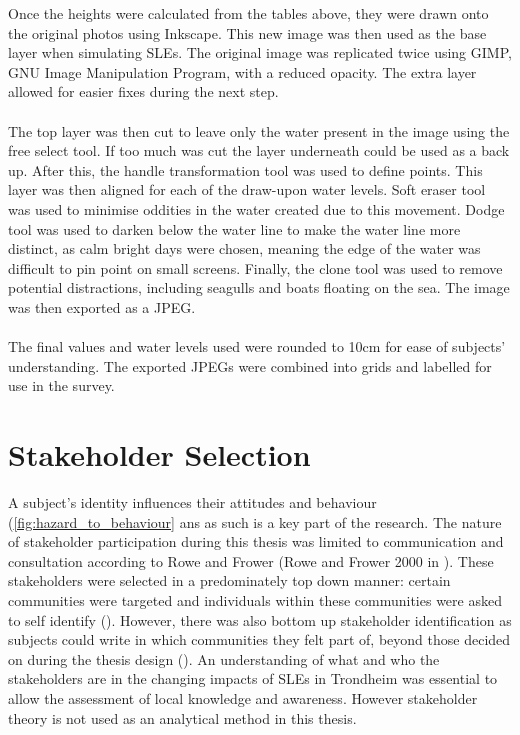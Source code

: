Once the heights were calculated from the tables above, they were drawn onto the original photos using Inkscape. This new image was then used as the base layer when simulating SLEs. The original image was replicated twice using GIMP, GNU Image Manipulation Program, with a reduced opacity. The extra layer allowed for easier fixes during the next step. 
\paragraph{}
The top layer was then cut to leave only the water present in the image using the free select tool. If too much was cut the layer underneath could be used as a back up. After this, the handle transformation tool was used to define points. This layer was then aligned for each of the draw-upon water levels. Soft eraser tool was used to minimise oddities in the water created due to this movement. Dodge tool was used to darken below the water line to make the water line more distinct, as calm bright days were chosen, meaning the edge of the water was difficult to pin point on small screens. Finally, the clone tool was used to remove potential distractions, including seagulls and boats floating on the sea. The image was then exported as a JPEG. 

\paragraph{}
The final values and water levels used were rounded to 10cm for ease of subjects' understanding. The exported JPEGs were combined into grids and labelled for use in the survey. 

\section{Stakeholder Selection}
A subject's identity influences their attitudes and behaviour (\ref{fig:hazard_to_behaviour} ans as such is a key part of the research. The nature of stakeholder participation during this thesis was limited to communication and consultation according to Rowe and Frower  (Rowe and Frower 2000 in \cite{reed_stakeholder_2008}). These stakeholders were selected in a predominately top down manner:  certain communities were targeted and individuals within these communities were asked to self identify (\cite{reed_stakeholder_2008}). However, there was also bottom up stakeholder identification as subjects could write in which communities they felt part of, beyond those decided on during the thesis design (\cite{reed_stakeholder_2008}). An understanding of what and who the stakeholders are in the changing impacts of SLEs in Trondheim was essential to allow the assessment of local knowledge and awareness. However stakeholder theory is not used as an analytical method in this thesis.
